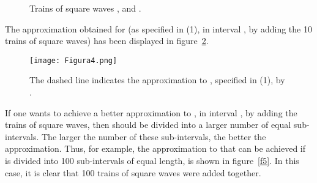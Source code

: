 \documentclass[11pt]{rMTA2010} \usepackage[utf8]{inputenc} \usepackage{graphicx} \usepackage{booktabs} \usepackage{array} \usepackage{enumerate}
\begin{document}
\begin{figure}[H]
\centering
{}\qquad
\caption[]{}
\end{figure}
\begin{figure}
\ContinuedFloat
{}\qquad
{}\qquad
\caption[]{}
\end{figure}
\begin{figure}
\ContinuedFloat
{}\qquad
{}\qquad
\caption[]{}
\end{figure}
\begin{figure}
\ContinuedFloat
{}\qquad
{}\qquad
\caption[]{}
\end{figure}
\begin{figure}
\ContinuedFloat
{}\qquad
{}\qquad
\caption[]{}
\end{figure}
\begin{figure}
\ContinuedFloat
{}\qquad
\caption{Trains of square waves , and .}
\label{f3}
\end{figure}
\newpage
The approximation obtained for  (as specified in (1), in interval , by adding the 10 trains of square waves) has been displayed in figure~\ref{f4}.
\begin{figure}[H]
\centering
\texttt{[image: Figura4.png]}
\caption{The dashed line indicates the approximation to , specified in (1), by .}
\label{f4}
\end{figure}

If one wants to achieve a better approximation to , in interval , by adding the trains of square waves, then  should be divided into a larger number of equal sub-intervals. The larger the number of these sub-intervals, the better the approximation. Thus, for example, the approximation to  that can be achieved if  is divided into 100 sub-intervals of equal length, is shown in figure~\ref{f5}. In this case, it is clear that 100 trains of square waves were added together.
\end{document}
